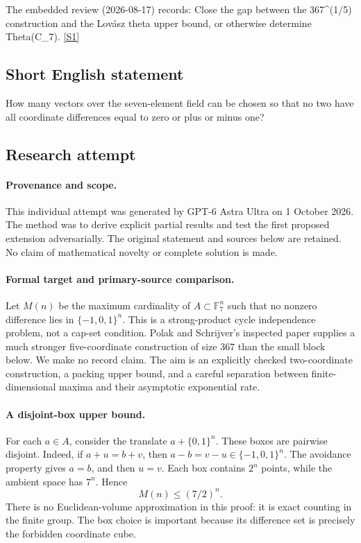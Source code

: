 \documentclass[11pt,a4paper]{article}
\newcommand{\F}{\mathbb{F}}
\newcommand{\sref}[2]{\hyperlink{source:#1:#2}{[S#2]}}
\begin{document}
The embedded review (2026-08-17) records: Close the gap between the 367\textasciicircum{}(1/5) construction and the Lovász theta upper bound, or otherwise determine Theta(C\_7). \sref{statement}{1}

\subsection{Short English statement}

How many vectors over the seven-element field can be chosen so that no two have all coordinate differences equal to zero or plus or minus one?

\subsection{Research attempt}

\paragraph{Provenance and scope.}
This individual attempt was generated by GPT-6 Astra Ultra on 1 October 2026. The method was to derive explicit partial results and test the first proposed extension adversarially. The original statement and sources below are retained. No claim of mathematical novelty or complete solution is made.

\paragraph{Formal target and primary-source comparison.}
Let $M(n)$ be the maximum cardinality of $A\subset\F_7^n$ such that no nonzero difference lies in $\{-1,0,1\}^n$. This is a strong-product cycle independence problem, not a cap-set condition. Polak and Schrijver's inspected paper supplies a much stronger five-coordinate construction of size $367$ than the small block below. We make no record claim. The aim is an explicitly checked two-coordinate construction, a packing upper bound, and a careful separation between finite-dimensional maxima and their asymptotic exponential rate.

\paragraph{A disjoint-box upper bound.}
For each $a\in A$, consider the translate $a+\{0,1\}^n$. These boxes are pairwise disjoint. Indeed, if $a+u=b+v$, then $a-b=v-u\in\{-1,0,1\}^n$. The avoidance property gives $a=b$, and then $u=v$. Each box contains $2^n$ points, while the ambient space has $7^n$. Hence
\[
 M(n)\leq(7/2)^n.
\]
There is no Euclidean-volume approximation in this proof: it is exact counting in the finite group. The box choice is important because its difference set is precisely the forbidden coordinate cube.
\end{document}
